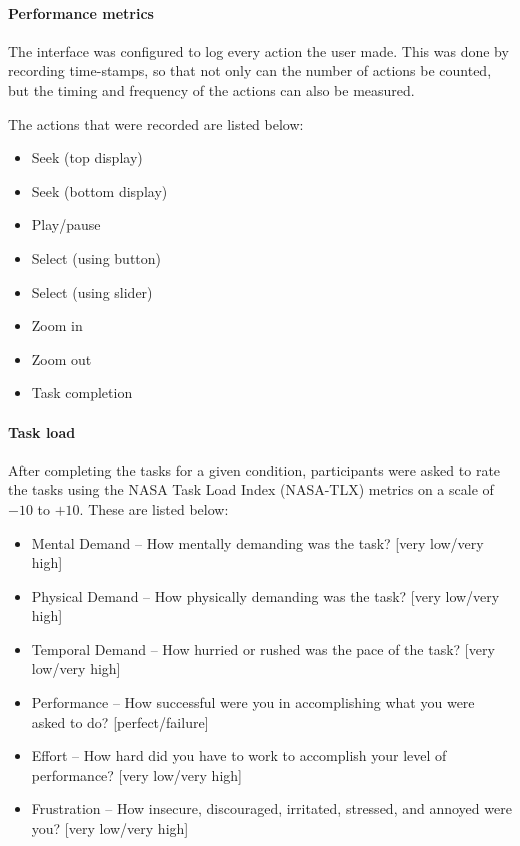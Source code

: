 \paragraph{Performance metrics}
The interface was configured to log every action the user made. This was done
by recording time-stamps, so that not only can the number of actions be counted,
but the timing and frequency of the actions can also be measured.

The actions that were recorded are listed below:

{\singlespacing
\begin{itemize}
  \item Seek (top display)
  \item Seek (bottom display)
  \item Play/pause
  \item Select (using button)
  \item Select (using slider)
  \item Zoom in
  \item Zoom out
  \item Task completion
\end{itemize}
}

\paragraph{Task load}
After completing the tasks for a given condition, participants were asked to
rate the tasks using the NASA Task Load Index (NASA-TLX) \cite{Hart1988}
metrics on a scale of $-10$ to $+10$. These are listed below:

{\singlespacing
\begin{itemize}
  \item Mental Demand -- How mentally demanding was the task? [very low/very
    high]
  \item Physical Demand -- How physically demanding was the task? [very
    low/very high]
  \item Temporal Demand -- How hurried or rushed was the pace of the task?
    [very low/very high]
  \item Performance -- How successful were you in accomplishing what you were
    asked to do? [perfect/failure]
  \item Effort -- How hard did you have to work to accomplish your level of
    performance? [very low/very high]
  \item Frustration -- How insecure, discouraged, irritated, stressed, and
    annoyed were you? [very low/very high]
\end{itemize}
}

